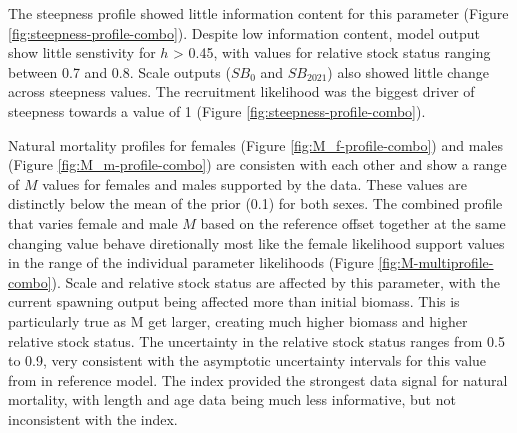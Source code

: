 \documentclass[11pt,
  english,
  a4paper,
]{article}
\begin{document}
\leavevmode\tagmcend\tagstructend\par


The steepness profile showed little information content for this parameter (Figure \ref{fig:steepness-profile-combo}). Despite low information content, model output show little senstivity for {\(h\)\leavevmode\tagmcend\tagstructend} \textgreater{} 0.45, with values for relative stock status ranging between 0.7 and 0.8. Scale outputs ({\(SB_0\)\leavevmode\tagmcend\tagstructend} and {\(SB_2021\)\leavevmode\tagmcend\tagstructend}) also showed little change across steepness values. The recruitment likelihood was the biggest driver of steepness towards a value of 1 (Figure \ref{fig:steepness-profile-combo}).

\leavevmode\tagmcend\tagstructend\par


Natural mortality profiles for females (Figure \ref{fig:M_f-profile-combo}) and males (Figure \ref{fig:M_m-profile-combo}) are consisten with each other and show a range of {\(M\)\leavevmode\tagmcend\tagstructend} values for females and males supported by the data. These values are distinctly below the mean of the prior (0.1) for both sexes. The combined profile that varies female and male {\(M\)\leavevmode\tagmcend\tagstructend} based on the reference offset together at the same changing value behave diretionally most like the female likelihood support values in the range of the individual parameter likelihoods (Figure \ref{fig:M-multiprofile-combo}). Scale and relative stock status are affected by this parameter, with the current spawning output being affected more than initial biomass. This is particularly true as M get larger, creating much higher biomass and higher relative stock status. The uncertainty in the relative stock status ranges from 0.5 to 0.9, very consistent with the asymptotic uncertainty intervals for this value from in reference model. The index provided the strongest data signal for natural mortality, with length and age data being much less informative, but not inconsistent with the index.

\leavevmode\tagmcend\tagstructend\par
\end{document}
